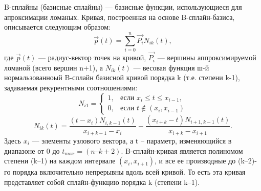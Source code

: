 B-сплайны (базисные сплайны) --- базисные функции, использующиеся для апроксимации ломаных. Кривая, построенная на основе B-сплайн-базиса, описывается следующим образом:
$$\vec{p}(t)=\sum^{n}_{i=0} \vec{P_i}N_{ik} (t),$$
где $\vec{p}(t)$ --- радиус-вектор точек на кривой, $\vec{P_i}$ --- вершины аппроксимируемой ломаной (всего вершин n+1), а $N_{ik} (t)$ --- весовая функция ш-й нормальзованноый B-сплайн базисной кривой порядка k (т.е. степени k-1), задаваемая рекурентными соотношениями:
\begin{equation*}
N_{i1} = 
 \begin{cases}
   1, &\text{если $x_i \leq t \leq x_{i-1},$}\\
   0, &\text{если $t \notin (x_i, x_{i-1})$}
 \end{cases}
\end{equation*}
$$ N_{ik} (t) = \frac{(t-x_i)N_{i,k-1}(t)}{x_{i+k-1} - x_i} - \frac{(x_{i+k}-t)N_{i+1,k-1}(t)}{x_{i+k} - x_{i+1}} .$$
Здесь $x_i$ --- элементы узлового вектора, а t – параметр, изменяю­щийся в диапазоне от 0 до $t_{max}=(n – k+2)$.
B-сплайн-кривая является полиномом степени (k–1) на каждом интервале $(x_i, x_{i+1})$, и все ее производные до (k–2)-го порядка включительно непрерывны вдоль всей кривой. То есть эта кривая представляет собой сплайн-функцию порядка k (степени k–1).
